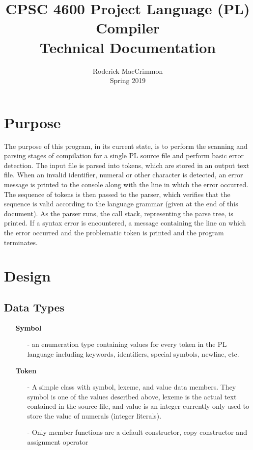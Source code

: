 \documentclass{article}
\begin{document}
\title{CPSC 4600 Project Language (PL) Compiler \\ \LARGE Technical Documentation}
\author{Roderick MacCrimmon \\ Spring 2019}
\date{}
\maketitle

\section{Purpose}

The purpose of this program, in its current state, is to perform the scanning and parsing stages of compilation for a single PL source file and perform basic error detection. The input file is parsed into tokens, which are stored in an output text file. When an invalid identifier, numeral or other character is detected, an error message is printed to the console along with the line in which the error occurred. The sequence of tokens is then passed to the parser, which verifies that the sequence is valid according to the language grammar (given at the end of this document). As the parser runs, the call stack, representing the parse tree, is printed. If a syntax error is encountered, a message containing the line on which the error occurred and the problematic token is printed and the program terminates.

\section{Design}

\subsection*{Data Types}

\begin{itemize}
    \item[] \textbf{Symbol}
        \begin{itemize}
            \item[-] an enumeration type containing values for every  token in the PL language including keywords, identifiers, special symbols, newline, etc.
        \end{itemize} 
    \item[] \textbf{Token} 
        \begin{itemize}
            \item[-] A simple class with symbol, lexeme, and value data members. They symbol is one of the values described above, lexeme is the actual text contained in the source file, and value is an integer currently only used to store the value of numerals (integer literals).
        \item[-] Only member functions are a default constructor, copy constructor and assignment operator 
        \end{itemize} 

\end{itemize}
\end{document}
